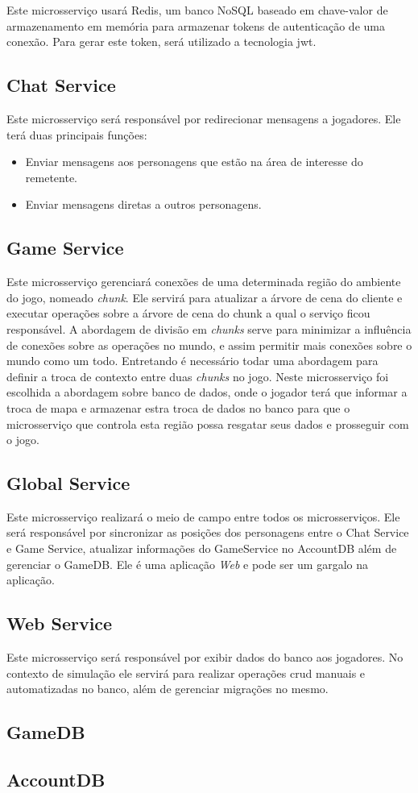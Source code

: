 Este microsserviço usará Redis, um banco NoSQL baseado em chave-valor de armazenamento em memória para armazenar tokens de autenticação de uma conexão.
%
Para gerar este token, será utilizado a tecnologia \ac{jwt}.

\subsection{Chat Service}


Este microsserviço será responsável por redirecionar mensagens a jogadores.
%
Ele terá duas principais funções:

\begin{itemize}
  \item Enviar mensagens aos personagens que estão na área de interesse do remetente.
  \item Enviar mensagens diretas a outros personagens.
\end{itemize}


\subsection{Game Service}

Este microsserviço gerenciará conexões de uma determinada região do ambiente do jogo, nomeado \textit{chunk}.
%
Ele servirá para atualizar a árvore de cena do cliente e executar operações sobre a árvore de cena do chunk a qual o serviço ficou responsável.
%
A abordagem de divisão em \textit{chunks} serve para minimizar a influência de conexões sobre as operações no mundo, e assim permitir mais conexões sobre o mundo como um todo.
%
Entretando é necessário todar uma abordagem para definir a troca de contexto entre duas \textit{chunks} no jogo.
%
Neste microsserviço foi escolhida a abordagem sobre banco de dados, onde o jogador terá que informar a troca de mapa e armazenar estra troca de dados no banco para que o microsserviço que controla esta região possa resgatar seus dados e prosseguir com o jogo.



\subsection{Global Service}

Este microsserviço realizará o meio de campo entre todos os microsserviços.
%
Ele será responsável por sincronizar as posições dos personagens entre o Chat Service e Game Service, atualizar informações do GameService no AccountDB além de gerenciar o GameDB.
%
Ele é uma aplicação \textit{Web} e pode ser um gargalo na aplicação.

\subsection{Web Service}

Este microsserviço será responsável por exibir dados do banco aos jogadores.
%
No contexto de simulação ele servirá para realizar operações \ac{crud} manuais e automatizadas no banco, além de gerenciar migrações no mesmo.

\subsection{GameDB}

\subsection{AccountDB}
